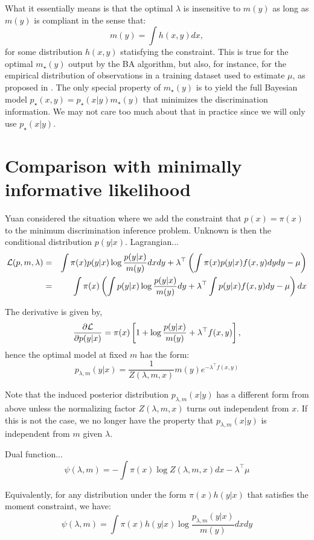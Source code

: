 \documentclass[english]{scrartcl}
\begin{document}
What it essentially means is that the optimal $\lambda$ is insensitive
to $m(y)$ as long as $m(y)$ is compliant in the sense that:
$$
m(y) = \int h(x,y) dx,
$$ for some distribution $h(x,y)$ statisfying the constraint. This is
true for the optimal $m_\star(y)$ output by the BA algorithm, but
also, for instance, for the empirical distribution of observations in
a training dataset used to estimate $\mu$, as proposed in
\cite{BergerA-96}. The only special property of $m_\star(y)$ is to
yield the full Bayesian model $p_\star(x,y)=p_\star(x|y)m_\star(y)$
that minimizes the discrimination information. We may not care too
much about that in practice since we will only use $p_\star(x|y)$. 

\section{Comparison with minimally informative likelihood}

Yuan \cite{Yuan-99} considered the situation where we add the
constraint that $p(x)=\pi(x)$ to the minimum discrimination inference
problem. Unknown is then the conditional distribution
$p(y|x)$. Lagrangian...
\begin{eqnarray*}
{\cal L}(p,m,\lambda)
 & = & 
\int \pi(x)p(y|x) \log \frac{p(y|x)}{m(y)} dxdy
+
\lambda^\top \left( 
\int \pi(x)p(y|x) f(x,y) dydy - \mu 
\right) \\
 & = & 
\int \pi(x)
\left( 
\int
p(y|x) \log \frac{p(y|x)}{m(y)} dy
+
\lambda^\top 
\int p(y|x) f(x,y) dy
- \mu 
\right)
dx 
\end{eqnarray*}

The derivative is given by,
$$
\frac{\partial\cal L}{\partial p(y|x)}
= 
\pi(x)\left[ 
1 + \log \frac{p(y|x)}{m(y)} 
+ \lambda^\top f(x,y)
\right],
$$
hence the optimal model at fixed $m$ has the form:
$$
p_{\lambda,m}(y|x) = \frac{1}{Z(\lambda,m,x)} m(y) e^{-\lambda^\top f(x,y)} 
$$

Note that the induced posterior distribution $p_{\lambda,m}(x|y)$ has
a different form from above unless the normalizing factor
$Z(\lambda,m,x)$ turns out independent from $x$. If this is not the
case, we no longer have the property that $p_{\lambda,m}(x|y)$ is
independent from $m$ given $\lambda$.

Dual function...
$$
\psi(\lambda,m) 
=
- \int \pi(x) \log Z(\lambda, m, x) dx
- \lambda^\top \mu
$$

Equivalently, for any distribution under the form $\pi(x)h(y|x)$ that
satisfies the moment constraint, we have:
$$
\psi(\lambda,m) 
=
\int \pi(x) h(y|x) \log \frac{p_{\lambda,m}(y|x)}{m(y)} dxdy
$$
\end{document}
